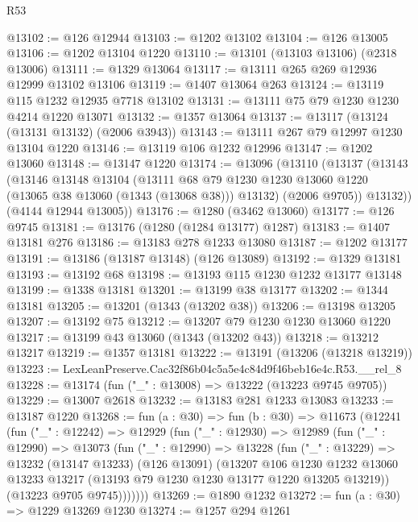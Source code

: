 \begin{lexlean}{R53}
\begin{coremodule}
@13102 := @126 @12944
@13103 := @1202 @13102
@13104 := @126 @13005
@13106 := @1202 @13104 @1220
@13110 := @13101 (@13103 @13106) (@2318 @13006)
@13111 := @1329 @13064
@13117 := @13111 @265 @269 @12936 @12999 @13102 @13106
@13119 := @1407 @13064 @263
@13124 := @13119 @115 @1232 @12935 @7718 @13102
@13131 := @13111 @75 @79 @1230 @1230 @4214 @1220 @13071
@13132 := @1357 @13064
@13137 := @13117 (@13124 (@13131 @13132) (@2006 @3943))
@13143 := @13111 @267 @79 @12997 @1230 @13104 @1220
@13146 := @13119 @106 @1232 @12996
@13147 := @1202 @13060
@13148 := @13147 @1220
@13174 := @13096
    (@13110
      (@13137
        (@13143
          (@13146
            @13148
            @13104
            (@13111
              @68
              @79
              @1230
              @1230
              @13060
              @1220
              (@13065 @38 @13060 (@1343 (@13068 @38)))
              @13132)
            (@2006 @9705))
          @13132))
      (@4144 @12944 @13005))
@13176 := @1280 (@3462 @13060)
@13177 := @126 @9745
@13181 := @13176 (@1280 (@1284 @13177) @1287)
@13183 := @1407 @13181 @276
@13186 := @13183 @278 @1233 @13080
@13187 := @1202 @13177
@13191 := @13186 (@13187 @13148) (@126 @13089)
@13192 := @1329 @13181
@13193 := @13192 @68
@13198 := @13193 @115 @1230 @1232 @13177 @13148
@13199 := @1338 @13181
@13201 := @13199 @38 @13177
@13202 := @1344 @13181
@13205 := @13201 (@1343 (@13202 @38))
@13206 := @13198 @13205
@13207 := @13192 @75
@13212 := @13207 @79 @1230 @1230 @13060 @1220
@13217 := @13199 @43 @13060 (@1343 (@13202 @43))
@13218 := @13212 @13217
@13219 := @1357 @13181
@13222 := @13191 (@13206 (@13218 @13219))
@13223 := LexLeanPreserve.Cac32f86b04c5a5e4c84d9f46beb16e4c.R53.__rel_8
@13228 := @13174 (fun ("_" : @13008) => @13222 (@13223 @9745 @9705))
@13229 := @13007 @2618
@13232 := @13183 @281 @1233 @13083
@13233 := @13187 @1220
@13268 := fun (a : @30) =>
  fun (b : @30) =>
  @11673
    (@12241
      (fun ("_" : @12242) =>
      @12929
        (fun ("_" : @12930) =>
        @12989
          (fun ("_" : @12990) =>
          @13073
            (fun ("_" : @12990) =>
            @13228
              (fun ("_" : @13229) =>
              @13232
                (@13147 @13233)
                (@126 @13091)
                (@13207
                  @106
                  @1230
                  @1232
                  @13060
                  @13233
                  @13217
                  (@13193 @79 @1230 @1230 @13177 @1220 @13205 @13219))
                (@13223 @9705 @9745)))))))
@13269 := @1890 @1232
@13272 := fun (a : @30) => @1229 @13269 @1230
@13274 := @1257 @294 @1261

\end{coremodule}
\end{lexlean}
